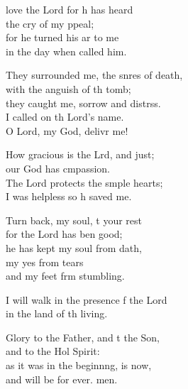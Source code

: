 \settowidth{\versewidth}{They surrounded me, the snares of death, *}
\begin{psalmverse}%
  \begin{patverse}
 love the Lord for h has heard\Med\\
the cry of my ppeal;\\
for he turned his ar to me\Med\\
in the day when  called him.

They surrounded me, the snres of death,\Med\\
with the anguish of th tomb;\\
they caught me, sorrow and distrss.\Flex\\
I called on th Lord’s name.\Med\\
O Lord, my God, delivr me!

How gracious is the Lrd, and just;\Med\\
our God has cmpassion.\\
The Lord protects the s\pointup{\i}mple hearts;\Med\\
I was helpless so h saved me.

Turn back, my soul, t your rest\Med\\
for the Lord has ben good;\\
he has kept my soul from dath,\Flex\\
my yes from tears\Med\\
and my feet frm stumbling.

I will walk in the presence f the Lord\Med\\
in the land of th living.

Glory to the Father, and t the Son,\Med\\
and to the Hol Spirit:\\
as it was in the beginn\pointup{\i}ng, is now,\Med\\
and will be for ever. men.
  \end{patverse}
\end{psalmverse}
